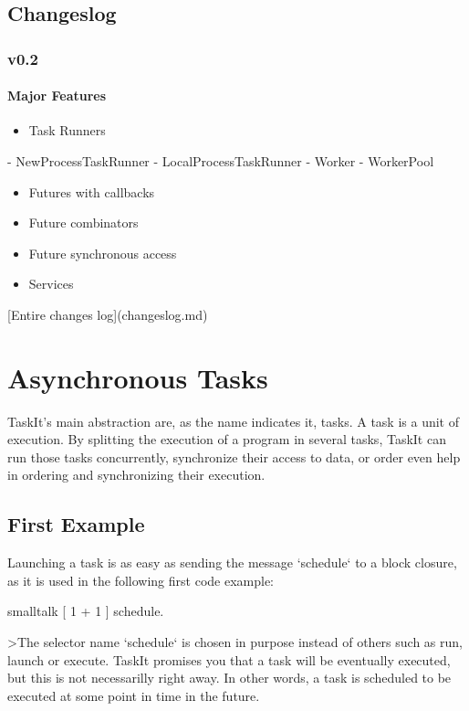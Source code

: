 \documentclass[10pt,twoside,english]{_support/latex/sbabook/sbabook}
\begin{document}
\section{Changeslog}\subsection{v0.2}\subsubsection{Major Features}
\begin{itemize}
\item Task Runners
\end{itemize}

  - NewProcessTaskRunner
  - LocalProcessTaskRunner
  - Worker
  - WorkerPool

\begin{itemize}
\item Futures with callbacks
\item Future combinators
\item Future synchronous access
\item Services
\end{itemize}

{[}Entire changes log{]}(changeslog.md)
\chapter{Asynchronous Tasks}
TaskIt's main abstraction are, as the name indicates it, tasks. A task is a unit of execution. By splitting the execution of a program in several tasks, TaskIt can run those tasks concurrently, synchronize their access to data, or order even help in ordering and synchronizing their execution.
\section{First Example}
Launching a task is as easy as sending the message `schedule` to a block closure, as it is used in the following first code example:

\begin{displaycode}{smalltalk}
[ 1 + 1 ] schedule.
\end{displaycode}

\textgreater{}The selector name `schedule` is chosen in purpose instead of others such as run, launch or execute. TaskIt promises you that a task will be eventually executed, but this is not necessarilly right away. In other words, a task is scheduled to be executed at some point in time in the future.
\end{document}
